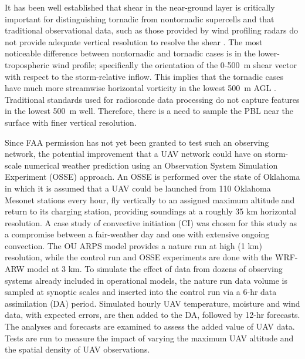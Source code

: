 \documentclass[sensors,review,submit,moreauthors,pdftex,10pt,a4paper]{mdpi}
\theoremstyle{mdpi}
\newcounter{ex}
\newcounter{re}
\theoremstyle{mdpidefinition}
\begin{document}
It has been well established that shear in the near-ground layer is critically important for distinguishing tornadic from nontornadic supercells and that traditional observational data, such as those provided by wind profiling radars do not provide adequate vertical resolution to resolve the shear \citep[e.g.,][]{markowski++1998_MWR}. The most noticeable difference between nontornadic and tornadic cases is in the lower-tropospheric wind profile; specifically the orientation of the 0-500~m shear vector with respect to the storm-relative inflow. This implies that the tornadic cases have much more streamwise horizontal vorticity in the lowest 500~m AGL \citep{coffer+2017_MWR}. Traditional standards used for radiosonde data processing do not capture features in the lowest 500~m well. Therefore, there is a need to sample the PBL near the surface with finer vertical resolution.

Since FAA permission has not yet been granted to test such an observing network, the potential improvement that a UAV network could have on storm-scale numerical weather prediction using an Observation System Simulation Experiment (OSSE) approach. An OSSE is performed over the state of Oklahoma in which it is assumed that a UAV could be launched from 110 Oklahoma Mesonet \citep{mcpheson++2007_JTECH} stations every hour, fly vertically to an assigned maximum altitude and return to its charging station, providing soundings at a roughly 35 km horizontal resolution. A case study of convective initiation (CI) was chosen for this study as a compromise between a fair-weather day and one with extensive ongoing convection. The OU ARPS \citep{xue++2000_MAP} model provides a nature run at high (1 km) resolution, while the control run and OSSE experiments are done with the WRF-ARW model at 3 km. To simulate the effect of data from dozens of observing systems already included in operational models, the nature run data volume is sampled at synoptic scales and inserted into the control run via a 6-hr data assimilation (DA) period. Simulated hourly UAV temperature, moisture and wind data, with expected errors, are then added to the DA, followed by 12-hr forecasts. The analyses and forecasts are examined to assess the added value of UAV data. Tests are run to measure the impact of varying the maximum UAV altitude and the spatial density of UAV observations.
\end{document}
